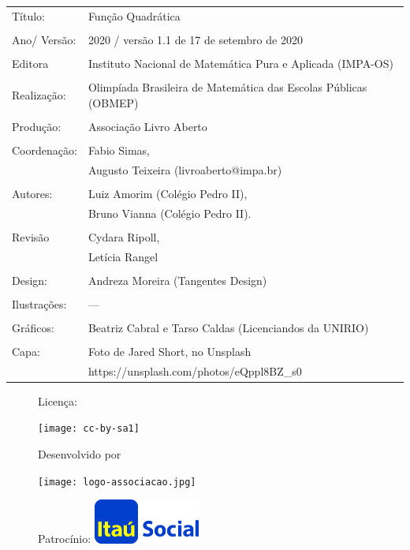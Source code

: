 \begin{tabular}{p{}p{}}
Título: & Função Quadrática\\
\\
Ano/ Versão: & 2020 / versão 1.1 de 17 de setembro de 2020\\
\\
Editora & Instituto Nacional de Matem\'atica Pura e Aplicada (IMPA-OS)\\
\\
Realização:& Olimp\'iada Brasileira de Matem\'atica das Escolas P\'ublicas (OBMEP)\\
\\
Produção:& Associação Livro Aberto\\
\\
Coordenação:& Fabio Simas, \\
			& Augusto Teixeira (livroaberto@impa.br)\\
\\
  Autores: & Luiz Amorim (Colégio Pedro II),\\
           & Bruno Vianna (Colégio Pedro II).\\

\\
Revisão &  Cydara Ripoll,  \\
        &  Letícia Rangel \\
\\
Design: & Andreza Moreira (Tangentes Design) \\
\\
  Ilustrações: & --- \\ 
\\
Gráficos: & Beatriz Cabral e Tarso Caldas (Licenciandos da UNIRIO)\\
\\
  Capa: & Foto de Jared Short, no Unsplash\\
  		& https://unsplash.com/photos/eQppl8BZ\_s0 \\

\end{tabular}
\vspace{.5cm}


\begin{figure}[b]
\begin{minipage}[l]{5cm}
\centering

{\large Licença:}

  \texttt{[image: cc-by-sa1]}
\end{minipage}\hfill
\begin{minipage}[c]{5cm}
\centering
{\large Desenvolvido por}

\texttt{[image: logo-associacao.jpg]}
\end{minipage}
\begin{minipage}[r]{5cm}
\centering

{\large Patrocínio:}
  \vspace{1em}
  \includegraphics[width=3.5cm]{itau}
\end{minipage}
\end{figure}

